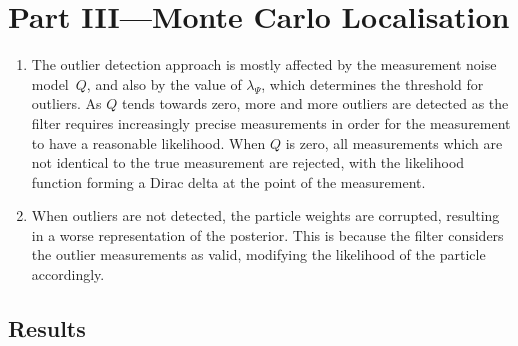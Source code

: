 \documentclass[a4paper,12pt]{article}
\begin{document}
\section{Part III---Monte Carlo Localisation}
\begin{enumerate}[resume]
\item The outlier detection approach is mostly affected by the measurement noise
  model~$Q$, and also by the value of $\lambda_\Psi$, which determines the
  threshold for outliers. As $Q$ tends towards zero, more and more outliers are
  detected as the filter requires increasingly precise measurements in order for
  the measurement to have a reasonable likelihood. When $Q$ is zero, all
  measurements which are not identical to the true measurement are rejected,
  with the likelihood function forming a Dirac delta at the point of the measurement.
\item When outliers are not detected, the particle weights are corrupted,
  resulting in a worse representation of the posterior. This is because the
  filter considers the outlier measurements as valid, modifying the likelihood
  of the particle accordingly.
\end{enumerate}
\subsection{Results}
\end{document}
